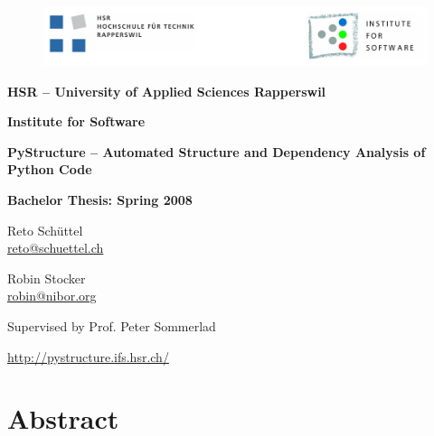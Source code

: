 \documentclass[12pt,halfparskip]{scrreprt}
\begin{document}
\begin{titlepage}
\begin{center}
\thispagestyle{empty}

\begin{figure}[h]
 \centering
 \vspace{0,5cm}
 \includegraphics[width=\textwidth]{img/hsr_logo}
\end{figure}

\vspace{1cm}
{\Large \bfseries HSR -- University of Applied Sciences Rapperswil}

\vspace{0,5cm}
{\Large \bfseries Institute for Software}

\vspace{2cm}
{\Huge \bfseries PyStructure -- Automated Structure and Dependency Analysis of Python Code}
\vspace{2cm}

{\Large \bfseries Bachelor Thesis: Spring 2008}

\vspace{0,5cm}
\SVNDate


\vspace{1cm}
Reto Schüttel \\ \url{reto@schuettel.ch}

\vspace{0,5cm}
Robin Stocker \\ \url{robin@nibor.org}

\vspace{0,5cm}
Supervised by Prof. Peter Sommerlad


\vspace{1cm}
\url{http://pystructure.ifs.hsr.ch/}

\end{center}
\end{titlepage}


\pagestyle{plain}

\chapter*{Abstract}
\end{document}
